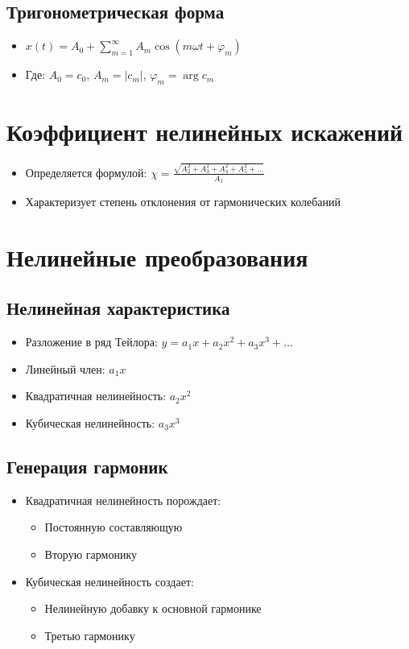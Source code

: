 \documentclass[12pt]{article}
\begin{document}
\subsection{Тригонометрическая форма}
\begin{itemize}
    \item $x(t)=A_0+\sum_{m=1}^{\infty} A_m \cos(m\omega t+\varphi_m)$
    \item Где: $A_0=c_0$, $A_m=|c_m|$, $\varphi_m=\arg c_m$
\end{itemize}

\section{Коэффициент нелинейных искажений}

\begin{itemize}
    \item Определяется формулой: $\chi=\frac{\sqrt{A_2^2+A_3^2+A_4^2+A_5^2+\ldots}}{A_1}$
    \item Характеризует степень отклонения от гармонических колебаний
\end{itemize}

\section{Нелинейные преобразования}

\subsection{Нелинейная характеристика}
\begin{itemize}
    \item Разложение в ряд Тейлора: $y=a_1x+a_2x^2+a_3x^3+\ldots$
    \item Линейный член: $a_1x$
    \item Квадратичная нелинейность: $a_2x^2$
    \item Кубическая нелинейность: $a_3x^3$
\end{itemize}

\subsection{Генерация гармоник}
\begin{itemize}
    \item Квадратичная нелинейность порождает:
        \begin{itemize}
            \item Постоянную составляющую
            \item Вторую гармонику
        \end{itemize}
    \item Кубическая нелинейность создает:
        \begin{itemize}
            \item Нелинейную добавку к основной гармонике
            \item Третью гармонику
        \end{itemize}
\end{itemize}
\end{document}
